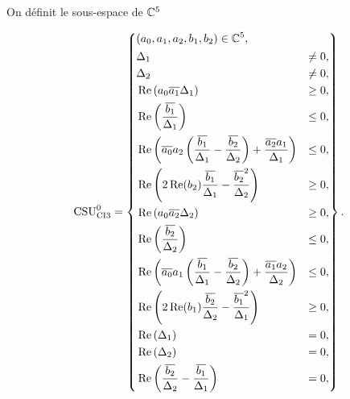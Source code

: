   \begin{defn}
    \label{def:csu:ci3-0}

    On définit le sous-espace de \(\CC^5\)

    \begin{equation*}
      \CSU[0]{CI3} = \left\lbrace 
      \begin{aligned}
      &(a_0,a_1,a_2,b_1,b_2) \in \CC^5,
      \\
      &\begin{aligned}
        &\Delta_1 &\not = 0,
        \\
        &\Delta_2 &\not = 0,
        \\
        &\Re\left(a_0\conj{a_1}\Delta_1\right) &\ge 0,
        \\
        &\Re\left(\frac{\conj{b_1}}{\Delta_1}\right) &\le 0,
        \\
        &\Re\left(\conj{a_0}a_2\left(\frac{\conj{b_1}}{\Delta_1}-\frac{\conj{b_2}}{\Delta_2}\right) + \frac{\conj{a_2}a_1}{\Delta_1} \right)&\le 0,
        \\
        &\Re\left(2\Re(b_2)\frac{\conj{b_1}}{\Delta_1}-\frac{\conj{b_2}^2}{\Delta_2}\right) &\ge 0,
        \\
        &\Re\left(a_0\conj{a_2}\Delta_2\right) &\ge 0,
        \\
        &\Re\left(\frac{\conj{b_2}}{\Delta_2}\right) &\le 0,
        \\
        &\Re\left(\conj{a_0}a_1\left(\frac{\conj{b_1}}{\Delta_1}-\frac{\conj{b_2}}{\Delta_2}\right) + \frac{\conj{a_1}a_2}{\Delta_2} \right)&\le 0,
        \\
        &\Re\left(2\Re(b_1)\frac{\conj{b_2}}{\Delta_2}-\frac{\conj{b_1}^2}{\Delta_1}\right) &\ge 0,
        \\
        &\Re\left(\Delta_1\right) &= 0,
        \\
        &\Re\left(\Delta_2\right) &= 0,
        \\
        &\Re\left(\frac{\conj{b_2}}{\Delta_2}-\frac{\conj{b_1}}{\Delta_1}\right) &= 0,
        \end{aligned}
      \end{aligned}
      \right\rbrace.
    \end{equation*}
  \end{defn}
  
